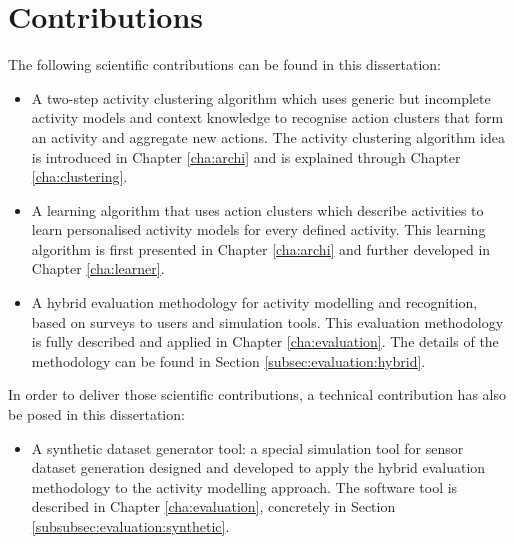 \section{Contributions}
\label{sec:intro:contributions}

The following scientific contributions can be found in this dissertation:

\begin{itemize}
  \item A two-step activity clustering algorithm which uses generic but incomplete activity models and context knowledge to recognise action clusters that form an activity and aggregate new actions. The activity clustering algorithm idea is introduced in Chapter \ref{cha:archi} and is explained through Chapter \ref{cha:clustering}.
  \item A learning algorithm that uses action clusters which describe activities to learn personalised activity models for every defined activity. This learning algorithm is first presented in Chapter \ref{cha:archi} and further developed in Chapter \ref{cha:learner}.
  \item A hybrid evaluation methodology for activity modelling and recognition, based on surveys to users and simulation tools. This evaluation methodology is fully described and applied in Chapter \ref{cha:evaluation}. The details of the methodology can be found in Section \ref{subsec:evaluation:hybrid}.
\end{itemize}

In order to deliver those scientific contributions, a technical contribution has also be posed in this dissertation:

\begin{itemize}
 \item A synthetic dataset generator tool: a special simulation tool for sensor dataset generation designed and developed to apply the hybrid evaluation methodology to the activity modelling approach. The software tool is described in Chapter \ref{cha:evaluation}, concretely in Section \ref{subsubsec:evaluation:synthetic}.
\end{itemize}
